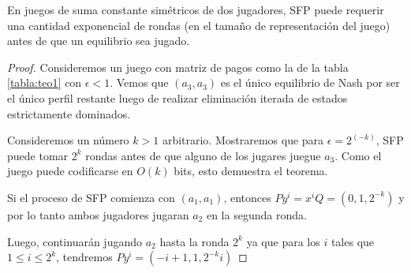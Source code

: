 \begin{theorem}
    En juegos de suma constante simétricos de dos jugadores, SFP puede requerir una cantidad exponencial de rondas
    (en el tamaño de representación del juego) antes de que un equilibrio sea jugado.
\end{theorem}

\begin{proof}
    Consideremos un juego con matriz de pagos como la de la tabla \ref{tabla:teo1} con $\epsilon < 1$. Vemos que $(a_3, a_3)$ es el único
    equilibrio de Nash por ser el único perfil restante luego de realizar eliminación iterada de estados estrictamente dominados.

    

    Consideremos un número $k > 1$ arbitrario. Mostraremos que para $\epsilon = 2^(-k)$, SFP puede tomar $2^k$ rondas antes de que
    alguno de los jugares juegue $a_3$. Como el juego puede codificarse en $O(k)$ bits, esto demuestra el teorema.

    Si el proceso de SFP comienza con $(a_1, a_1)$, entonces $Py^i = x^iQ = (0, 1, 2^{-k})$ y por lo tanto ambos jugadores jugaran $a_2$
    en la segunda ronda.

    Luego, continuarán jugando $a_2$ hasta la ronda $2^k$ ya que para los $i$ tales que $1 \le i \le 2^k$, tendremos $Py^i = (-i + 1, 1, 2^{-k}i)$


\end{proof}